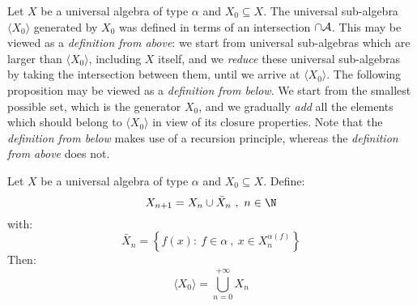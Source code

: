 Let $X$ be a universal algebra of type $\alpha$ and $X_{0}\subseteq
X$. The universal sub-algebra $\langle X_{0}\rangle$ generated by
$X_{0}$ was defined in terms of an intersection $\cap{\cal A}$. This
may be viewed as a {\em definition from above}: we start from
universal sub-algebras which are larger than $\langle X_{0}\rangle$,
including $X$ itself, and we {\em reduce} these universal
sub-algebras by taking the intersection between them, until we
arrive at $\langle X_{0}\rangle$. The following proposition may be
viewed as a {\em definition from below}. We start from the smallest
possible set, which is the generator $X_{0}$, and we gradually {\em
add} all the elements which should belong to $\langle X_{0}\rangle$
in view of its closure properties. Note that the {\em definition
from below} makes use of a recursion principle, whereas the {\em
definition from above} does not.
\begin{prop}\label{logic:prop:characterisation:generated}
Let $X$ be a universal algebra of type $\alpha$ and $X_{0}\subseteq
X$. Define:
    \[
    X_{n+1}=X_{n}\cup\bar{X}_{n}\ ,\ n\in\N
    \]
with:
    \[
    \bar{X}_{n}=\left\{f(x):\ f\in\alpha\ ,\ x\in X_{n}^{\alpha(f)}\right\}
    \]
Then:
    \[
    \langle X_{0}\rangle=\bigcup_{n=0}^{+\infty}X_{n}
    \]
\end{prop}
